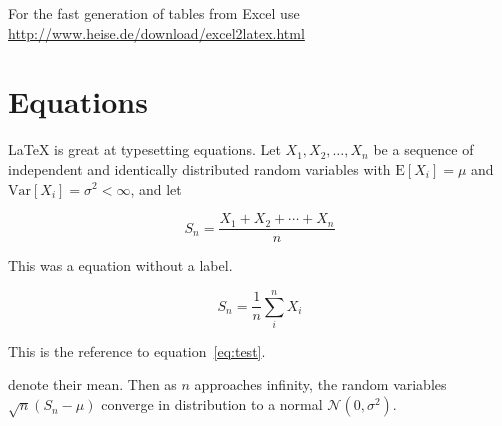 For the fast generation of tables from Excel use \url{http://www.heise.de/download/excel2latex.html}

\section{Equations}

\LaTeX{} is great at typesetting equations. Let $X_1, X_2, \ldots, X_n$ be a sequence of independent and identically distributed random variables with $\text{E}[X_i] = \mu$ and $\text{Var}[X_i] = \sigma^2 < \infty$, and let

$$S_n = \frac{X_1 + X_2 + \cdots + X_n}{n}$$

This was a equation without a label.
      
\begin{equation}
S_n = \frac{1}{n}\sum_{i}^{n} X_i
\label{eq:test}
\end{equation}


This is the reference to equation~\ref{eq:test}.      


denote their mean. Then as $n$ approaches infinity, the random variables $\sqrt{n}(S_n - \mu)$ converge in distribution to a normal $\mathcal{N}(0, \sigma^2)$.


